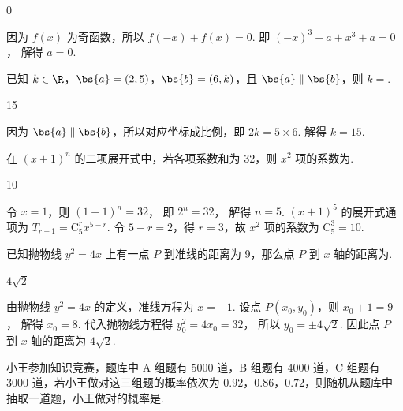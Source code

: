 \begin{answer}
0
\end{answer}

\begin{solution}
因为 \(f(x)\) 为奇函数，所以
\(f(-x)+f(x)=0\).
即
\((-x)^3+a+x^3+a=0\)，
解得 \(a=0\).
\end{solution}

\begin{problem}
已知 \(k\in \R\)，\(\bs{a}=(2,5)\)，\(\bs{b}=(6,k)\)，且 \(\bs{a}\parallel\bs{b}\)，则 \(k=\)\fillinblank{}.
\end{problem}

\begin{answer}
15
\end{answer}

\begin{solution}
因为 \(\bs{a}\parallel\bs{b}\)，所以对应坐标成比例，即
\(2k=5\times 6\).
解得
\(k=15\).
\end{solution}

\begin{problem}
在 \((x+1)^n\) 的二项展开式中，若各项系数和为 32，则 \(x^2\) 项的系数为\fillinblank{}.
\end{problem}

\begin{answer}
10
\end{answer}

\begin{solution}
令 \(x=1\)，则
\((1+1)^n=32\)，
即
\(2^n=32\)，
解得 \(n=5\). \((x+1)^5\) 的展开式通项为
\(T_{r+1}=\mathrm{C}_5^r x^{5-r}\).
令 \(5-r=2\)，得 \(r=3\)，故 \(x^2\) 项的系数为
\(\mathrm{C}_5^3=10\).
\end{solution}

\begin{problem}
已知抛物线 \(y^2=4x\) 上有一点 \(P\) 到准线的距离为 9，那么点 \(P\) 到 \(x\) 轴的距离为\fillinblank{}.
\end{problem}

\begin{answer}
\(4\sqrt{2}\)
\end{answer}

\begin{solution}
由抛物线 \(y^2=4x\) 的定义，准线方程为 \(x=-1\). 设点 \(P(x_0,y_0)\)，则
\(x_0+1=9\)，
解得 \(x_0=8\). 代入抛物线方程得
\(y_0^2=4x_0=32\)，
所以
\(y_0=\pm 4\sqrt{2}\).
因此点 \(P\) 到 \(x\) 轴的距离为 \(4\sqrt{2}\).
\end{solution}

\begin{problem}
小王参加知识竞赛，题库中 A 组题有 \(5000\) 道，B 组题有 \(4000\) 道，C 组题有 \(3000\) 道，若小王做对这三组题的概率依次为 \(0.92\)，\(0.86\)，\(0.72\)，则随机从题库中抽取一道题，小王做对的概率是\fillinblank{}.
\end{problem}


